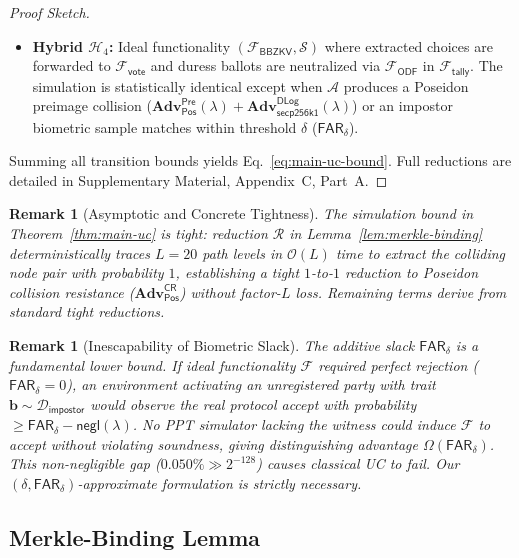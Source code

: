\documentclass[10pt,letterpaper,journal]{IEEEtran}
\newtheorem{remark}[theorem]{Remark}
\begin{document}
\begin{proof}[Proof Sketch]
\begin{itemize}[leftmargin=*,noitemsep,topsep=1pt]
  \item \textbf{Hybrid $\mathcal{H}_4$:} Ideal functionality $(\mathcal{F}_{\mathsf{BBZKV}}, \mathcal{S})$ where extracted choices are forwarded to $\mathcal{F}_{\mathsf{vote}}$ and duress ballots are neutralized via $\mathcal{F}_{\mathsf{ODF}}$ in $\mathcal{F}_{\mathsf{tally}}$. The simulation is statistically identical except when $\mathcal{A}$ produces a Poseidon preimage collision ($\mathbf{Adv}_{\mathsf{Pos}}^{\mathsf{Pre}}(\lambda) + \mathbf{Adv}_{\mathsf{secp256k1}}^{\mathsf{DLog}}(\lambda)$) or an impostor biometric sample matches within threshold $\delta$ ($\mathsf{FAR}_\delta$).
\end{itemize}
Summing all transition bounds yields Eq.~\eqref{eq:main-uc-bound}. Full reductions are detailed in Supplementary Material, Appendix~C, Part~A.
\end{proof}

\begin{remark}[Asymptotic and Concrete Tightness]
\label{rem:tightness}
The simulation bound in Theorem~\ref{thm:main-uc} is tight: reduction $\mathcal{R}$ in Lemma~\ref{lem:merkle-binding} deterministically traces $L=20$ path levels in $\mathcal{O}(L)$ time to extract the colliding node pair with probability $1$, establishing a tight $1$-to-$1$ reduction to Poseidon collision resistance ($\mathbf{Adv}_{\mathsf{Pos}}^{\mathsf{CR}}$) without factor-$L$ loss. Remaining terms derive from standard tight reductions.
\end{remark}

\begin{remark}[Inescapability of Biometric Slack]
\label{rem:impossibility}
The additive slack $\mathsf{FAR}_\delta$ is a fundamental lower bound. If ideal functionality $\mathcal{F}$ required perfect rejection ($\mathsf{FAR}_\delta = 0$), an environment activating an unregistered party with trait $\mathbf{b} \sim \mathcal{D}_{\mathsf{impostor}}$ would observe the real protocol accept with probability $\ge \mathsf{FAR}_\delta - \mathsf{negl}(\lambda)$. No PPT simulator lacking the witness could induce $\mathcal{F}$ to accept without violating soundness, giving distinguishing advantage $\Omega(\mathsf{FAR}_\delta)$. This non-negligible gap ($0.050\% \gg 2^{-128}$) causes classical UC to fail. Our $(\delta, \mathsf{FAR}_\delta)$-approximate formulation is strictly necessary.
\end{remark}

\subsection{Merkle-Binding Lemma}
\label{sec:merkle-lemma}
\end{document}
